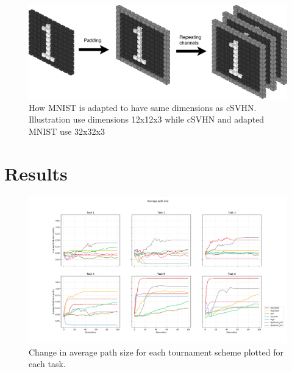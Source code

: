 \begin{figure}[h]
    \includegraphics[width=\textwidth]{Chapters/Experiments/search_algo/figures/MNISTpadding+repeating.png}
    \caption{How MNIST is adapted to have same dimensions as cSVHN. Illustration use dimensions 12x12x3 while cSVHN and adapted MNIST use 32x32x3}
    \label{fig:MNISTpadding}
\end{figure}







\section{Results}

\begin{figure}[h]
    \includegraphics[width=\textwidth]{Chapters/Experiments/search_algo/figures/Average_path_size.png}
    \caption{Change in average path size for each tournament scheme plotted for each task.}
    \label{fig:search.avg_path_size}
\end{figure}

